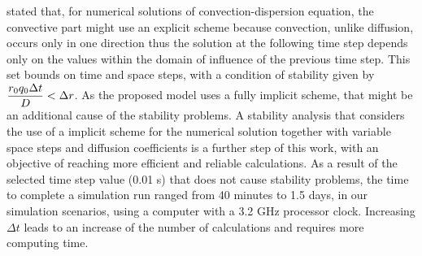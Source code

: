 \citeonline[roose2009] stated that, for numerical solutions of convection-dispersion equation, the convective part might use an explicit scheme because convection, unlike diffusion, occurs only in one direction thus the solution at the following time step depends only on the values within the domain of influence of the previous time step. 
This set bounds on time and space steps, with a condition of stability given by $\displaystyle{r_0 q_0 \Delta t \over D} < \Delta r$. 
{\tblue As the proposed model uses a fully implicit scheme, that might be an additional cause of the stability problems. 
A stability analysis that considers the use of a implicit scheme for the numerical solution together with variable space steps and diffusion coefficients is a further step of this work, with an objective of reaching more efficient and reliable calculations.
}
{\tblue As a result of the selected time step value (0.01 s) that does not cause stability problems, the time to complete a simulation run ranged from 40 minutes to 1.5 days, in our simulation scenarios, using a computer with a 3.2 GHz processor clock.
Increasing $\Delta t$ leads to an increase of the number of calculations and requires more computing time.
}




